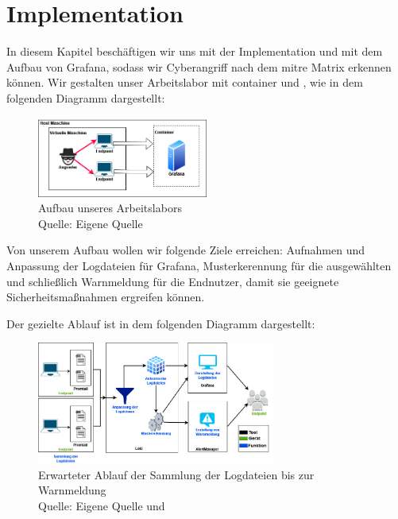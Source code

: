 \section{Implementation}
In diesem Kapitel beschäftigen wir uns mit der Implementation und mit dem Aufbau von Grafana, sodass wir \gls{Cyberangriff} nach dem \gls{mitre} Matrix erkennen können. Wir gestalten unser Arbeitslabor mit \gls{container} und , wie in dem folgenden Diagramm dargestellt:

\begin{figure}[H]
   \centering
   \includegraphics[width=0.5\textwidth]{assets/Arbeitslabor.jpg}
   \caption{Aufbau unseres Arbeitslabors \\Quelle: Eigene Quelle}
   \centering
\end{figure}

Von unserem Aufbau wollen wir folgende Ziele erreichen: Aufnahmen und Anpassung der Logdateien für Grafana, Musterkerennung für die ausgewählten  und schließlich Warnmeldung für die Endnutzer, damit sie geeignete Sicherheitsmaßnahmen ergreifen können. 

Der gezielte Ablauf ist in dem folgenden Diagramm dargestellt:

\begin{figure}[H]
   \centering
   \includegraphics[width=0.7\textwidth]{assets/Ablauf_grafana2.jpg}
   \caption{Erwarteter Ablauf der Sammlung der Logdateien bis zur Warnmeldung \\ Quelle: Eigene Quelle und \citep{Grafana_loki}}
   \centering
\end{figure}

